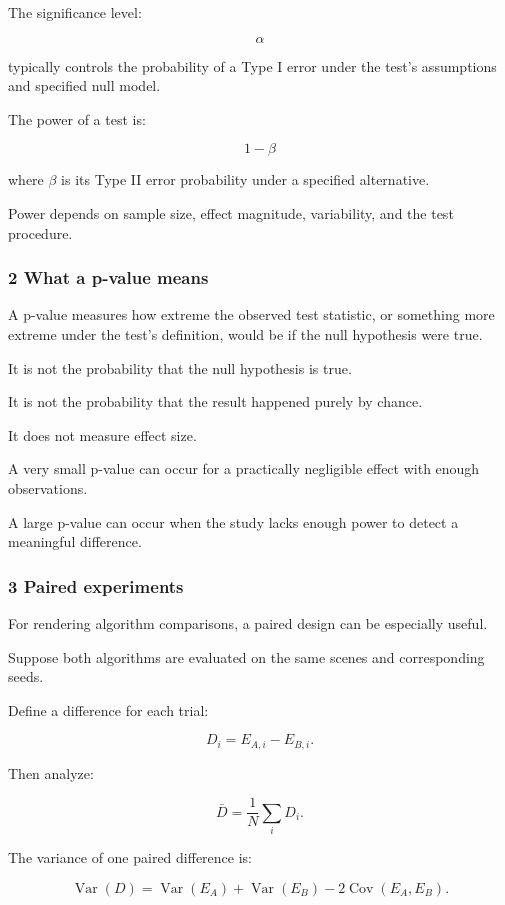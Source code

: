 The significance level:

\[
 \alpha
\]

typically controls the probability of a Type I error under the test's assumptions and specified null model.

The power of a test is:

\[
 \boxed{ 1-\beta }
\]

where \(\beta\) is its Type II error probability under a specified alternative.

Power depends on sample size, effect magnitude, variability, and the test procedure.

\subsubsection{2 What a p-value means}\label{02-foundations-ii-ch030-what-a-p-value-means}

A p-value measures how extreme the observed test statistic, or something more extreme under the test's definition, would be if the null hypothesis were true.

It is not the probability that the null hypothesis is true.

It is not the probability that the result happened purely by chance.

It does not measure effect size.

A very small p-value can occur for a practically negligible effect with enough observations.

A large p-value can occur when the study lacks enough power to detect a meaningful difference.

\subsubsection{3 Paired experiments}\label{02-foundations-ii-ch030-paired-experiments}

For rendering algorithm comparisons, a paired design can be especially useful.

Suppose both algorithms are evaluated on the same scenes and corresponding seeds.

Define a difference for each trial:

\[
 D_i=E_{A,i}-E_{B,i}.
\]

Then analyze:

\[
 \bar D=\frac1N\sum_iD_i.
\]

The variance of one paired difference is:

\[
 \operatorname{Var}(D) = \operatorname{Var}(E_A)+ \operatorname{Var}(E_B)- 2\operatorname{Cov}(E_A,E_B).
\]

